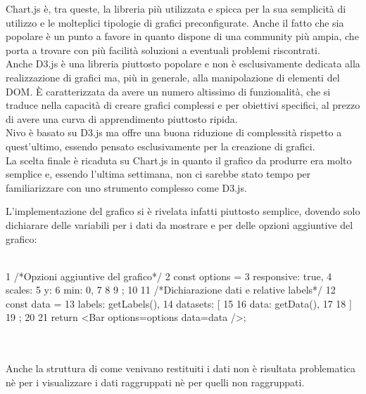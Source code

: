 \noindent Chart.js è, tra queste, la libreria più utilizzata e spicca per la sua semplicità di utilizzo e le molteplici tipologie di grafici preconfigurate. Anche il fatto che sia popolare è un punto a favore in quanto dispone di una community più ampia, che porta a trovare con più facilità soluzioni a eventuali problemi riscontrati.\\
Anche D3.js è una libreria piuttosto popolare e non è esclusivamente dedicata alla realizzazione di grafici ma, più in generale, alla manipolazione di elementi del DOM. È caratterizzata da avere un numero altissimo di funzionalità, che si traduce nella capacità di creare grafici complessi e per obiettivi specifici, al prezzo di avere una curva di apprendimento piuttosto ripida.\\
Nivo è basato su D3.js ma offre una buona riduzione di complessità rispetto a quest'ultimo, essendo pensato esclusivamente per la creazione di grafici.\\

La scelta finale è ricaduta su Chart.js in quanto il grafico da produrre era molto semplice e, essendo l'ultima settimana, non ci sarebbe stato tempo per familiarizzare con uno strumento complesso come D3.js.

L'implementazione del grafico si è rivelata infatti piuttosto semplice, dovendo solo dichiarare delle variabili per i dati da mostrare e per delle opzioni aggiuntive del grafico:

\begin{code}[frame=tb, label={code:chart}, caption={Esempio di utilizzo di Chart.js}]\\
1   /*Opzioni aggiuntive del grafico*/
2   const options = {
3     responsive: true,
4     scales: {
5       y: {
6         min: 0,
7       }
8     }
9   };
10
11  /*Dichiarazione dati e relative labels*/
12  const data = {
13    labels: getLabels(),
14    datasets: [
15      {
16        data: getData(),
17      }
18    ]
19  };
20
21  return <Bar options={options} data={data} />;
\end{code}\\\\

\noindent Anche la struttura di come venivano restituiti i dati non è risultata problematica nè per i visualizzare i dati raggruppati nè per quelli non raggruppati.

